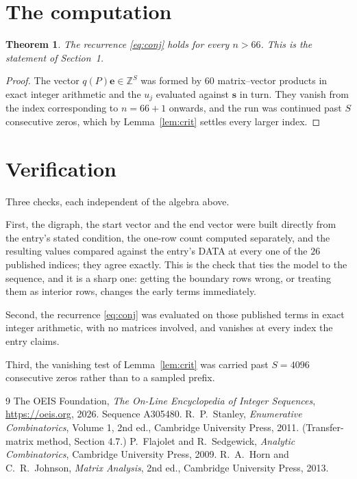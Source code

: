 \documentclass[11pt,a4paper]{article}
\theoremstyle{plain}
\newtheorem{theorem}{Theorem}
\theoremstyle{definition}
\begin{document}
\section{The computation}

\begin{theorem}
The recurrence \eqref{eq:conj} holds for every $n>66$. This is the statement of
Section~1.
\end{theorem}

\begin{proof}
The vector $q(P)\mathbf{e}\in\mathbb{Z}^{S}$ was formed by $60$ matrix--vector
products in exact integer arithmetic and the $u_j$ evaluated against $\mathbf{s}$ in turn.
They vanish from the index corresponding to $n=66+1$ onwards, and the run was continued
past $S$ consecutive zeros, which by Lemma~\ref{lem:crit} settles every larger index.
\end{proof}

\section{Verification}

Three checks, each independent of the algebra above.

First, the digraph, the start vector and the end vector were built directly from the
entry's stated condition, the one-row count computed separately, and the resulting values
compared against the entry's DATA at every one of the $26$ published indices; they
agree exactly. This is the check that ties the model to the sequence, and it is a sharp one:
getting the boundary rows wrong, or treating them as interior rows, changes the early terms
immediately.

Second, the recurrence \eqref{eq:conj} was evaluated on those published terms in exact
integer arithmetic, with no matrices involved, and vanishes at every index the entry claims.

Third, the vanishing test of Lemma~\ref{lem:crit} was carried past $S=4096$ consecutive
zeros rather than to a sampled prefix.

\begin{thebibliography}{9}
 The OEIS Foundation, \emph{The On-Line Encyclopedia of Integer
Sequences}, \url{https://oeis.org}, 2026. Sequence A305480.
 R.~P.~Stanley, \emph{Enumerative Combinatorics}, Volume 1, 2nd ed.,
Cambridge University Press, 2011. (Transfer-matrix method, Section 4.7.)
 P.~Flajolet and R.~Sedgewick, \emph{Analytic Combinatorics}, Cambridge
University Press, 2009.
 R.~A.~Horn and C.~R.~Johnson, \emph{Matrix Analysis}, 2nd ed., Cambridge
University Press, 2013.
\end{thebibliography}
\end{document}
